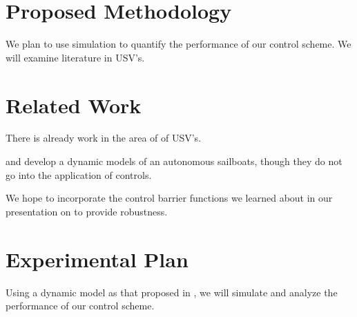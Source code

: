 \documentclass[conference]{IEEEtran}
\begin{document}
\section{Proposed Methodology}
We plan to use simulation to quantify the performance of our control scheme. We will examine literature in USV's.
\section{Related Work}
There is already work in the area of of USV's.

\cite{Setiawan2020} and \cite{Buehler2018} develop a dynamic models of an autonomous sailboats, though they do not go into the application of controls.

We hope to incorporate the control barrier functions we learned about in our presentation on \cite{Ames2019} to provide robustness.


\section{Experimental Plan}
Using a dynamic model as that proposed in \cite{Buehler2018}, we will simulate and analyze the performance of our control scheme.



\end{document}
